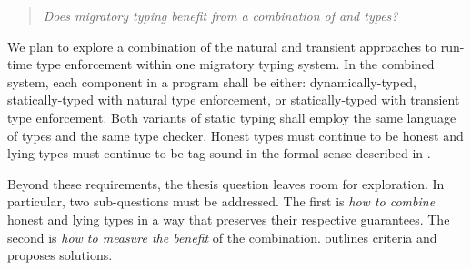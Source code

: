 

\begin{quote}
  \emph{Does migratory typing benefit from a combination of \tdeep{} and \tshallow{} types?}
\end{quote}

We plan to explore a combination of the natural and transient approaches to
 run-time type enforcement within one migratory typing system.
In the combined system, each component in a program shall be either:
 dynamically-typed,
 statically-typed with natural type enforcement,
 or statically-typed with transient type enforcement.
Both variants of static typing shall employ the same language of types and the
 same type checker.
Honest types must continue to be honest
 and lying types must continue to be tag-sound
 in the formal sense described in .

Beyond these requirements, the thesis question leaves room for exploration.
In particular, two sub-questions must be addressed.
The first is \emph{how to combine}\/ honest and lying
 types in a way that preserves their respective guarantees.
The second is \emph{how to measure the benefit}\/ of the combination.
 outlines criteria and proposes solutions.

